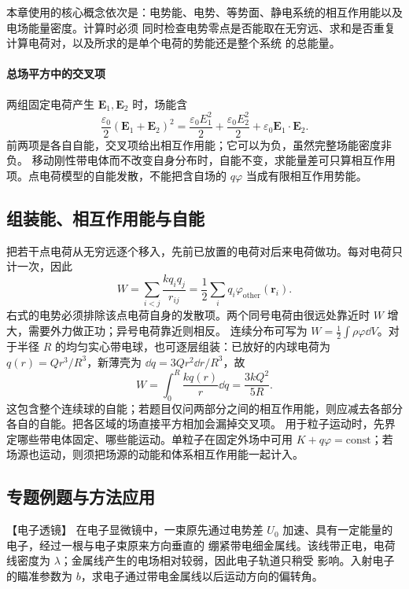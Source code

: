本章使用的核心概念依次是：电势能、电势、等势面、静电系统的相互作用能以及电场能量密度。计算时必须
同时检查电势零点是否能取在无穷远、求和是否重复计算电荷对，以及所求的是单个电荷的势能还是整个系统
的总能量。

\paragraph{总场平方中的交叉项}
两组固定电荷产生 $\boldsymbol E_1,\boldsymbol E_2$ 时，场能含
\[
 \frac{\varepsilon_0}{2}(\boldsymbol E_1+\boldsymbol E_2)^2
 =\frac{\varepsilon_0E_1^2}{2}+\frac{\varepsilon_0E_2^2}{2}
 +\varepsilon_0\boldsymbol E_1\cdot\boldsymbol E_2.
\]
前两项是各自自能，交叉项给出相互作用能；它可以为负，虽然完整场能密度非负。
移动刚性带电体而不改变自身分布时，自能不变，求能量差可只算相互作用项。点电荷模型的自能发散，不能把含自场的 $q\varphi$ 当成有限相互作用势能。




\subsection{组装能、相互作用能与自能}
把若干点电荷从无穷远逐个移入，先前已放置的电荷对后来电荷做功。每对电荷只计一次，因此
\[
 W=\sum_{i<j}\frac{kq_iq_j}{r_{ij}}
 =\frac12\sum_i q_i\varphi_{\mathrm{other}}(\boldsymbol r_i).
\]
右式的电势必须排除该点电荷自身的发散项。两个同号电荷由很远处靠近时 $W$ 增大，需要外力做正功；异号电荷靠近则相反。
连续分布可写为 $W=\tfrac12\int\rho\varphi\dd V$。对于半径 $R$ 的均匀实心带电球，也可逐层组装：已放好的内球电荷为 $q(r)=Qr^3/R^3$，新薄壳为 $\dd q=3Qr^2\dd r/R^3$，故
\[
 W=\int_0^R\frac{kq(r)}r\dd q=\frac{3kQ^2}{5R}.
\]
这包含整个连续球的自能；若题目仅问两部分之间的相互作用能，则应减去各部分各自的自能。把各区域的场直接平方相加会漏掉交叉项。
用于粒子运动时，先界定哪些带电体固定、哪些能运动。单粒子在固定外场中可用 $K+q\varphi=\mathrm{const}$；若场源也运动，则须把场源的动能和体系相互作用能一起计入。


\subsection{专题例题与方法应用}

\begin{origexamplebox}{【电子透镜】}\label{ch19:ex:s32-1-7}
在电子显微镜中，一束原先通过电势差 $U_0$ 加速、具有一定能量的电子，经过一根与电子束原来方向垂直的
绷紧带电细金属线。该线带正电，电荷线密度为 $\lambda$；金属线产生的电场相对较弱，因此电子轨道只稍受
影响。入射电子的瞄准参数为 $b$，求电子通过带电金属线以后运动方向的偏转角。

\ThQElectronLens
\end{origexamplebox}\par\nopagebreak[4]

